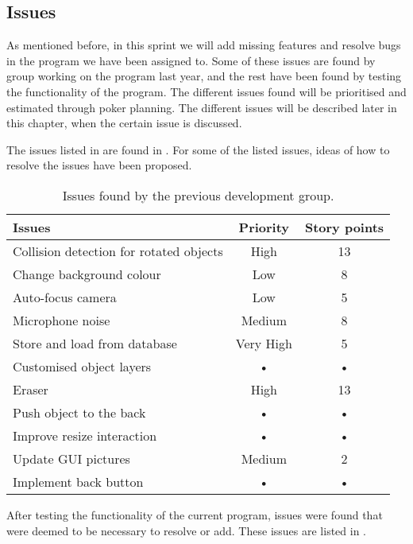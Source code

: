 \subsection{Issues}
As mentioned before, in this sprint we will add missing features and resolve bugs in the program we have been assigned to.
Some of these issues are found by group working on the program last year, and the rest have been found by testing the functionality of the program.
The different issues found will be prioritised and estimated through poker planning.
The different issues will be described later in this chapter, when the certain issue is discussed.

The issues listed in  are found in .
For some of the listed issues, ideas of how to resolve the issues have been proposed.

\begin{table}[h]
\begin{tabular}{|p{5cm}|c|c|}
\hline 
Issues & Priority & Story points \\ 
\hline 
Collision detection for rotated objects & High & 13 \\ 
\hline 
Change background colour & Low & 8 \\ 
\hline 
Auto-focus camera & Low & 5 \\ 
\hline 
Microphone noise & Medium & 8 \\ 
\hline 
Store and load from database & Very High & 5 \\ 
\hline 
Customised object layers & • & • \\ 
\hline 
Eraser & High & 13 \\ 
\hline 
Push object to the back & • & • \\ 
\hline 
Improve resize interaction & • & • \\ 
\hline 
Update GUI pictures & Medium & 2 \\ 
\hline 
Implement back button & • & • \\ 
\hline 
\end{tabular}
\caption{Issues found by the previous development group.}
\label{table:oldissues}
\end{table}

After testing the functionality of the current program, issues were found that were deemed to be necessary to resolve or add.
These issues are listed in .

